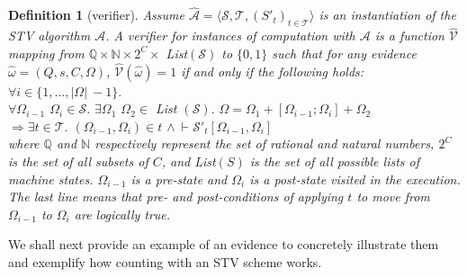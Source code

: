 \documentclass[10pt,conference]{IEEEtran}
\newtheorem{definition}{Definition}
\begin{document}
\begin{definition}[verifier]\label{verifier}
Assume $\hat{\mathcal{A}}= \langle \mathcal{S}, \mathcal{T}, (S'_t)_{t \in \mathcal{T}} \rangle$ is an instantiation of the STV algorithm $\mathcal{A}$. A verifier for instances of computation with $\mathcal{A}$ is a function $\hat{\mathcal{V}}$ mapping from $\mathbb{Q}\times\mathbb{N}\times 2^{C}\times$ \textsf{List}$(\mathcal{S})$ to $\{0,1\}$ such that for any evidence $\hat{\omega} = (Q,s,C,\Omega)$, $\hat{\mathcal{V}}(\hat{\omega}) = 1$ if and only if the following holds:\\
$\forall i\in\{1,\dots, |\Omega|~-1\}.$ \\
\hspace*{0.2cm}$\forall \Omega_{i-1}$ $\Omega_{i}\in\mathcal{S}.$
$\exists \Omega_{1}$ $\Omega_{2}\in$ \textsf{List} $(\mathcal{S}).$ $\Omega = \Omega_{1} + [\Omega_{i-1};\Omega_{i}] + \Omega_{2}$  
\\\hspace*{0.4cm}$\Rightarrow \exists t\in\mathcal{T}.$  $(\Omega_{i-1},\Omega_{i})\in t$ $\wedge~\vdash\mathcal{S}'_{t}[\Omega_{i-1},\Omega_{i}]$\\ 
where $\mathbb{Q}$ and $\mathbb{N}$ respectively represent the set of rational and natural numbers, $2^{C}$ is the set of all subsets of $C$, and \textsf{List}$(S)$ is the set of all possible lists of machine states. $\Omega_{i-1}$ is a pre-state and $\Omega_{i}$ is a post-state visited in the execution. The last line means that pre- and post-conditions  of applying $t$ to move from $\Omega_{i-1}$ to $\Omega_{i}$  are logically true. 
\end{definition} 

We shall next provide an example of an evidence to concretely illustrate them and exemplify how counting with an STV scheme works. 

\end{document}
